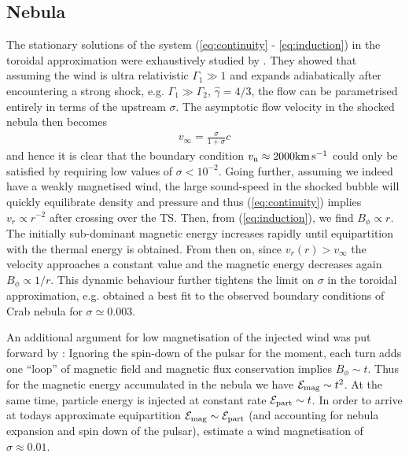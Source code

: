 \subsection{Nebula}

The stationary solutions of the system (\ref{eq:continuity} - \ref{eq:induction}) in the toroidal approximation were exhaustively studied by \cite{1984ApJ...283..694K}.  They showed that assuming the wind is ultra relativistic $\Gamma_1\gg1$ and expands adiabatically after encountering a strong shock, e.g. $\Gamma_1\gg\Gamma_2$, $\hat{\gamma}=4/3$, the flow can be parametrised entirely in terms of the upstream $\sigma$.  
The asymptotic flow velocity in the shocked nebula then becomes
\begin{align}
v_{\infty} = \frac{\sigma}{1+\sigma} c
\end{align}
and hence it is clear that the boundary condition $v_{\rm n}\approx 2000 \rm km\, s^{-1}$ could only be satisfied by requiring low values of $\sigma<10^{-2}$.  
Going further, assuming we indeed have a weakly magnetised wind, the large sound-speed in the shocked bubble will quickly equilibrate density and pressure and thus (\ref{eq:continuity}) implies $v_r\propto r^{-2}$ after crossing over the TS.  Then, from (\ref{eq:induction}), we find $B_\phi\propto r$.  The initially sub-dominant magnetic energy increases rapidly until equipartition with the thermal energy is obtained.  From then on, since $v_r(r)>v_{\infty}$ the velocity approaches a constant value and the magnetic energy decreases again $B_\phi\propto 1/r$.  
This dynamic behaviour further tightens the limit on $\sigma$ in the toroidal approximation, e.g. \cite{1984ApJ...283..694K} obtained a best fit to the observed boundary conditions of Crab nebula for $\sigma\simeq 0.003$.  

An additional argument for low magnetisation of the injected wind was put forward by \cite{1974MNRAS.167....1R}:  Ignoring the spin-down of the pulsar for the moment, each turn adds one ``loop'' of magnetic field and magnetic flux conservation implies $B_\phi\sim t$.  Thus for the magnetic energy accumulated in the nebula we have $\mathcal{E}_{\rm mag}\sim t^2$.  At the same time, particle energy is injected at constant rate $\mathcal{E}_{\rm part}\sim t$. In order to arrive at todays approximate equipartition $\mathcal{E}_{\rm mag}\sim\mathcal{E}_{\rm part}$ (and accounting for nebula expansion and spin down of the pulsar), \cite{1974MNRAS.167....1R} estimate a wind magnetisation of $\sigma\approx0.01$.


